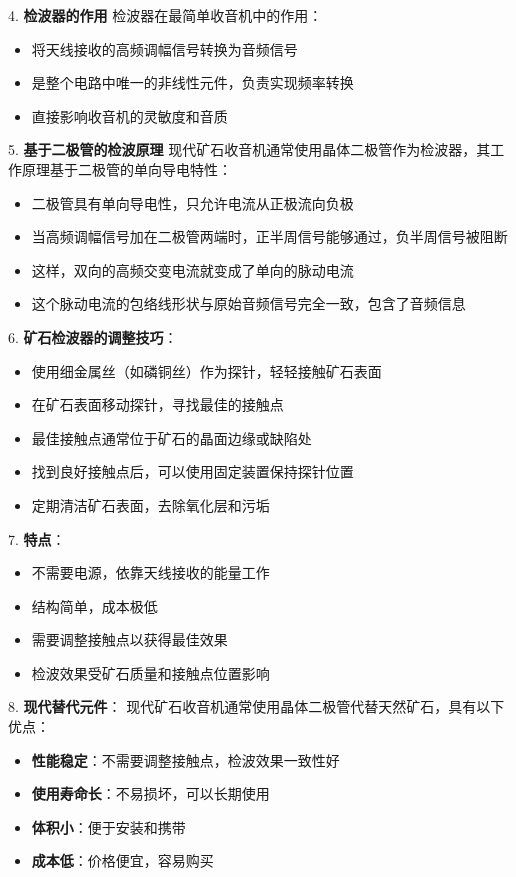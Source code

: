 \documentclass[12pt,UTF8]{ctexbook}
\begin{document}
4. \textbf{检波器的作用}
   检波器在最简单收音机中的作用：
   \begin{itemize}[leftmargin=3.5em]
       \item 将天线接收的高频调幅信号转换为音频信号
       \item 是整个电路中唯一的非线性元件，负责实现频率转换
       \item 直接影响收音机的灵敏度和音质
   \end{itemize}

5. \textbf{基于二极管的检波原理}
   现代矿石收音机通常使用晶体二极管作为检波器，其工作原理基于二极管的单向导电特性：
   \begin{itemize}[leftmargin=3.5em]
     \item 二极管具有单向导电性，只允许电流从正极流向负极
     \item 当高频调幅信号加在二极管两端时，正半周信号能够通过，负半周信号被阻断
     \item 这样，双向的高频交变电流就变成了单向的脉动电流
     \item 这个脉动电流的包络线形状与原始音频信号完全一致，包含了音频信息
   \end{itemize}

6. \textbf{矿石检波器的调整技巧}：
   \begin{itemize}[leftmargin=3.5em]
       \item 使用细金属丝（如磷铜丝）作为探针，轻轻接触矿石表面
       \item 在矿石表面移动探针，寻找最佳的接触点
       \item 最佳接触点通常位于矿石的晶面边缘或缺陷处
       \item 找到良好接触点后，可以使用固定装置保持探针位置
       \item 定期清洁矿石表面，去除氧化层和污垢
   \end{itemize}

7. \textbf{特点}：
   \begin{itemize}[leftmargin=3.5em]
   \item 不需要电源，依靠天线接收的能量工作
   \item 结构简单，成本极低
   \item 需要调整接触点以获得最佳效果
   \item 检波效果受矿石质量和接触点位置影响
   \end{itemize}

8. \textbf{现代替代元件}：
   现代矿石收音机通常使用晶体二极管代替天然矿石，具有以下优点：
   \begin{itemize}[leftmargin=3.5em]
       \item \textbf{性能稳定}：不需要调整接触点，检波效果一致性好
       \item \textbf{使用寿命长}：不易损坏，可以长期使用
       \item \textbf{体积小}：便于安装和携带
       \item \textbf{成本低}：价格便宜，容易购买
   \end{itemize}
\end{document}
